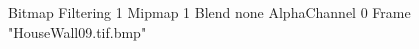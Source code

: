 {Bitmap
	{Filtering 1}
	{Mipmap 1}
	{Blend none}
	{AlphaChannel 0}
	{Frame "HouseWall09.tif.bmp"}
}
